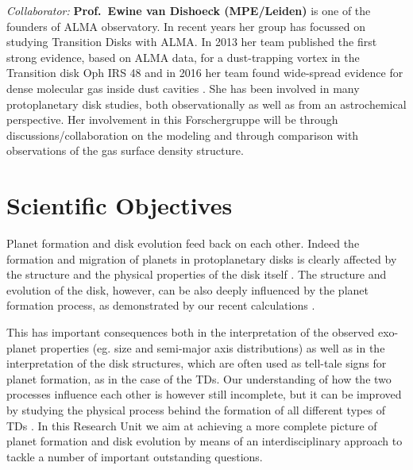 \documentclass[10pt,fleqn,twoside]{article}
\begin{document}
{\it Collaborator:} {\bf Prof.\ Ewine van Dishoeck (MPE/Leiden)}
is one of the founders of ALMA observatory. In recent years her group
has focussed on studying Transition Disks with ALMA. In 2013 her team
published the first strong evidence, based on ALMA data, for a
dust-trapping vortex in the Transition disk Oph IRS 48 \citep{2013Sci...340.1199V}
and in 2016 her team found wide-spread
 evidence for dense molecular gas inside dust cavities \citep{2016A&A...585A..58V}. 
She has been
involved in many protoplanetary disk studies, both observationally as
well as from an astrochemical perspective. Her involvement in this Forschergruppe
will be through discussions/collaboration on the modeling and through comparison with
 observations of the gas surface density structure.\\


\section{Scientific Objectives}

Planet formation and disk evolution feed back on each other. Indeed
the formation and migration of planets in protoplanetary disks is
clearly affected by the structure and the physical properties of the
disk itself \citep[e.g.][to cite only a few of the works coming from our team]{2016arXiv161101070D, 2015MNRAS.450.3008E}. 
The
structure and evolution of the disk, however, can be also deeply
influenced by the planet formation process, as demonstrated by our
recent calculations \citep[e.g.,][]{2013MNRAS.430.1392R, 2015MNRAS.454.2173R}.

This has important consequences both in the interpretation of the observed
exo-planet properties (eg. size and semi-major axis distributions) as
well as in the interpretation of the disk structures, which are often
used as tell-tale signs for planet formation, as in the case of the
TDs. Our understanding of how the two processes
influence each other is however still incomplete, but it can be
improved by studying the physical process behind the formation of all
different types of TDs . 
In this Research Unit we aim at achieving a more complete picture of
planet formation and disk evolution by means of an interdisciplinary
approach to tackle a number of important outstanding questions. 
\\
\end{document}
